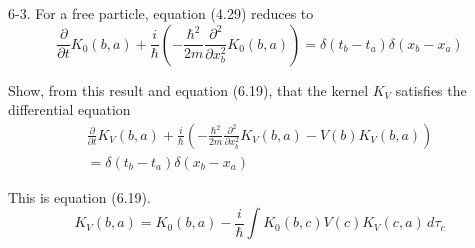 \documentclass[12pt]{article}
\begin{document}
6-3.
For a free particle, equation (4.29) reduces to
\begin{equation*}
\frac{\partial}{\partial t}K_0(b,a)+\frac{i}{\hbar}
\left(-\frac{\hbar^2}{2m}\frac{\partial^2}{\partial x_b^2}K_0(b,a)\right)
=\delta(t_b-t_a)\delta(x_b-x_a)
\tag{6.20}
\end{equation*}

Show, from this result and equation (6.19), that the kernel
$K_V$ satisfies the differential equation
\begin{multline*}
\frac{\partial}{\partial t}K_V(b,a)+\frac{i}{\hbar}
\left(-\frac{\hbar^2}{2m}\frac{\partial^2}{\partial x_b^2}K_V(b,a)-V(b)K_V(b,a)\right)
\\
=\delta(t_b-t_a)\delta(x_b-x_a)
\tag{6.21}
\end{multline*}

This is equation (6.19).
\begin{equation*}
K_V(b,a)=K_0(b,a)-\frac{i}{\hbar}
\int K_0(b,c)V(c)K_V(c,a)\,d\tau_c
\tag{6.19}
\end{equation*}
\end{document}
